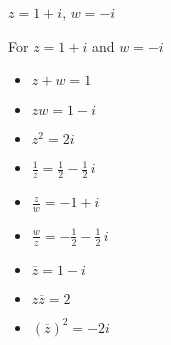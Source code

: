 {$z = 1+i$, $w = -i$}
{For $z = 1+i$ and $w = -i$

\begin{itemize}

\item $z+w = 1$

\item $zw = 1-i$

\item $z^2 = 2i$

\item $\frac{1}{z} = \frac{1}{2} - \frac{1}{2} \, i$

\item $\frac{z}{w} = -1+i$

\item $\frac{w}{z} = -\frac{1}{2} - \frac{1}{2} \, i$

\item $\overline{z} = 1-i$

\item $z\overline{z} = 2$

\item $(\overline{z})^2 = -2i$

\end{itemize}
}
